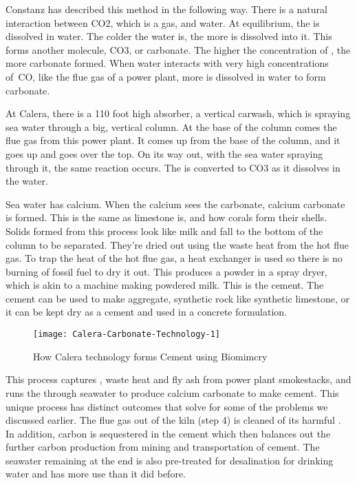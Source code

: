 Constanz has described this method in the following way. There is a natural interaction between CO2, which is a gas, and water. At equilibrium, the \CO is dissolved in water. The colder the water is, the more \CO is dissolved into it. This forms another molecule, CO3, or carbonate. The higher the concentration of \CO, the more carbonate formed. When water interacts with very high concentrations of\ CO, like the flue gas of a power plant, more \CO is dissolved in water to form carbonate. 

At Calera, there is a 110 foot high absorber, a vertical carwash, which is spraying sea water through a big, vertical column. At the base of the column comes the flue gas from this power plant. It comes up from the base of the column, and it goes up and goes over the top. On its way out, with the sea water spraying through it, the same reaction occurs. The \CO is converted to CO3 as it dissolves in the water.

Sea water has calcium. When the calcium sees the carbonate, calcium carbonate is formed. This is the same as limestone is, and how corals form their shells. Solids formed from this process look like milk and fall to the bottom of the column to be separated. They're dried out using the waste heat from the hot flue gas. To trap the heat of the hot flue gas, a heat exchanger is used so there is no burning of fossil fuel to dry it out. This produces a powder in a spray dryer, which is akin to a machine making powdered milk. This is the cement. The cement can be used to make aggregate, synthetic rock like synthetic limestone, or it can be kept dry as a cement and used in a concrete formulation.

\begin{figure}[h]
\texttt{[image: Calera-Carbonate-Technology-1]}
\caption{How Calera technology forms Cement using Biomimcry}
\label{fig:Calera-Carbonate-Technology-1}
\end{figure}

This process captures \CO, waste heat and fly ash from power plant smokestacks, and runs the \CO through seawater to produce calcium carbonate to make cement. This unique process has distinct outcomes that solve for some of the problems we discussed earlier. The flue gas out of the kiln (step 4) is cleaned of its harmful \CO. In addition, carbon is sequestered in the cement which then balances out the further carbon production from mining and transportation of cement. The seawater remaining at the end is also pre-treated for desalination for drinking water and has more use than it did before.  


